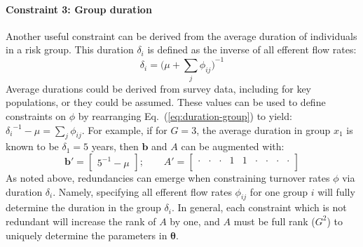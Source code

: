 \paragraph{Constraint 3: Group duration}
Another useful constraint can be derived from
the average duration of individuals in a risk group.
This duration $\delta_i$ is defined as the inverse of all efferent flow rates:
\begin{equation}\label{eq:duration-group}
\delta_i = {\bigg(\mu + \sum_{j}{\phi_{ij}}\bigg)}^{-1}
\end{equation}
Average durations could be derived from survey data, including for key populations, %
or they could be assumed.
These values can be used to define constraints on $\phi$ by
rearranging Eq.~(\ref{eq:duration-group}) to yield:
${\delta_{i}}^{-1} - \mu = \sum_{j}{\phi_{ij}}$.
For example, if for $G = 3$,
the average duration in group $x_1$ is known to be $\delta_1 = 5$ years,
then $\bm{b}$ and $A$ can be augmented with:
\begin{equation}
\bm{b}' = \left[\begin{array}{c}
{5}^{-1} - \mu
\end{array}\right];\qquad
A' = \left[\begin{array}{ccccccccc}
\cdot & \cdot & \cdot & 1 & 1 & \cdot & \cdot & \cdot & \cdot \\
\end{array}\right]
\end{equation}
As noted above, redundancies can emerge
when constraining turnover rates $\phi$ via duration $\delta_i$.
Namely, specifying all efferent flow rates $\phi_{ij}$ for one group $i$
will fully determine the duration in the group $\delta_i$.
In general, each constraint which is not redundant will increase the rank of $A$ by one,
and $A$ must be full rank ($G^2$) to uniquely determine the parameters in $\bm{\theta}$.
